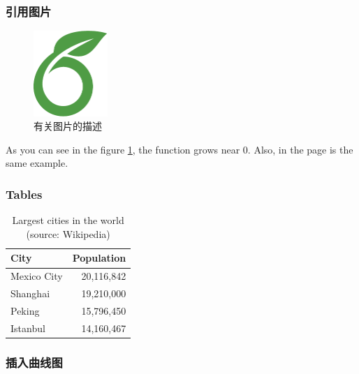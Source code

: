 \documentclass{beamer}
\begin{document}
\begin{frame}
\frametitle{引用图片}
\begin{figure}[h]
    \centering
    \includegraphics[width=0.25\textwidth]{overleaf-logo}
    \caption{有关图片的描述}
    \label{图1}
\end{figure}
As you can see in the figure \ref{图1}, the function grows near 0. Also, in the page \pageref{图1} is the same example.
\end{frame}

\begin{frame}
\frametitle{Tables}
\begin{table}
    \caption{Largest cities in the world (source: Wikipedia)}
    \begin{tabular}{@{} lr @{}}
        \toprule
        City & Population\\
        \midrule
        Mexico City & 20,116,842\\
        Shanghai & 19,210,000\\
        Peking & 15,796,450\\
        Istanbul & 14,160,467\\
        \bottomrule
    \end{tabular}
\end{table}
\end{frame}

\begin{frame}
\frametitle{插入曲线图}
  \begin{figure}
  \end{figure}
\end{frame}
\end{document}
